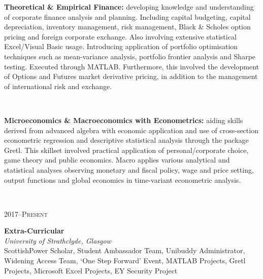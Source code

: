 \documentclass[11pt, english]{article}
\begin{document}
{\begin{minipage}[t]{.15\linewidth}
        \hfill 
        \textsc{}
\end{minipage}
\hfill\vline\hfill
\begin{minipage}[t]{.80\linewidth}
	\textbf{Theoretical \& Empirical Finance:} developing knowledge and understanding of corporate finance analysis and planning. Including capital budgeting, capital depreciation, inventory management, risk management, Black \& Scholes option pricing and foreign corporate exchange. Also involving extensive statistical Excel/Visual Basic usage. Introducing application of portfolio optimisation techniques such as mean-variance analysis, portfolio frontier analysis and Sharpe testing. Executed through MATLAB. Furthermore, this involved the development of Options and Futures market derivative pricing, in addition to the management of international risk and exchange.
\end{minipage}\\

\begin{minipage}[t]{.15\linewidth}
	\hfill 
        \textsc{}
\end{minipage}
\hfill\vline\hfill
\begin{minipage}[t]{.80\linewidth}
	\textbf{Microeconomics \& Macroeconomics with Econometrics:} aiding skills derived from advanced algebra with economic application and use of cross-section econometric regression and descriptive statistical analysis through the package Gretl. This skillset involved practical application of personal/corporate choice, game theory and public economics. Macro applies various analytical and statistical analyses observing monetary and fiscal policy, wage and price setting, output functions and global economics in time-variant econometric analysis.
\end{minipage}\\
\vspace{0.25cm} 

\begin{minipage}[t]{.15\linewidth}
        \hfill             
        \textsc{2017--Present}
\end{minipage}                    
\hfill\vline\hfill
\begin{minipage}[t]{.80\linewidth}
	\textbf{Extra-Curricular}\\            
        \textit{University of Strathclyde, Glasgow}\\
	ScottishPower Scholar, Student Ambassador Team, Unibuddy Administrator, Widening Access Team, `One Step Forward' Event, MATLAB Projects, Gretl Projects, Microsoft Excel Projects, EY Security Project
\end{minipage}\\
\vspace{0.25cm}

}
\end{document}
